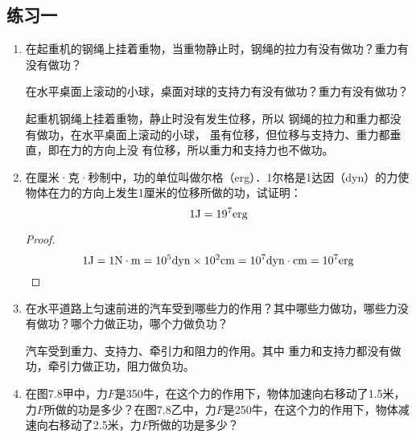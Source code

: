 \subsection{练习一}
\begin{enumerate}
    \item 在起重机的钢绳上挂着重物，当重物静止时，钢绳的拉力有没有做功？重力有没有做功？

    在水平桌面上滚动的小球，桌面对球的支持力有没有做功？重力有没有做功？

    \begin{solution}
    起重机钢绳上挂着重物，静止时没有发生位移，所以
钢绳的拉力和重力都没有做功，在水平桌面上滚动的小球，
虽有位移，但位移与支持力、重力都垂直，即在力的方向上没
有位移，所以重力和支持力也不做功。
    \end{solution}
    \item 在厘米·克·秒制中，功的单位叫做尔格（erg）．1尔格是1达因（dyn）的力使物体在力的方向上发生1厘米的位移所做的功，试证明：
    \[1{\rm J}=19^7{\rm erg} \]

    \begin{proof}
\[1{\rm J}=1{\rm N\cdot m}=10^5{\rm dyn}\x 10^2{\rm cm}=10^7{\rm dyn\cdot cm}=10^7{\rm erg}\]
    \end{proof}
    \item 在水平道路上匀速前进的汽车受到哪些力的作用？其中哪些力做功，哪些力没有做功？哪个力做正功，哪个力做负功？

    \begin{solution}
        汽车受到重力、支持力、牵引力和阻力的作用。其中
        重力和支持力都没有做功，牵引力做正功，阻力做负功。
    \end{solution}
    \item 在图7.8甲中，力$F$是350牛，在这个力的作用下，物体加速向右移动了1.5米，力$F$所做的功是多少？在图7.8乙中，力$F$是250牛，在这个力的作用下，物体减速向右移动了2.5米，力$F$所做的功是多少？

\begin{figure}[htp]\centering
{}\qquad 
\begin{tikzpicture}[>=stealth, thick, scale=1]


\end{tikzpicture}
\end{figure}
\end{enumerate}
